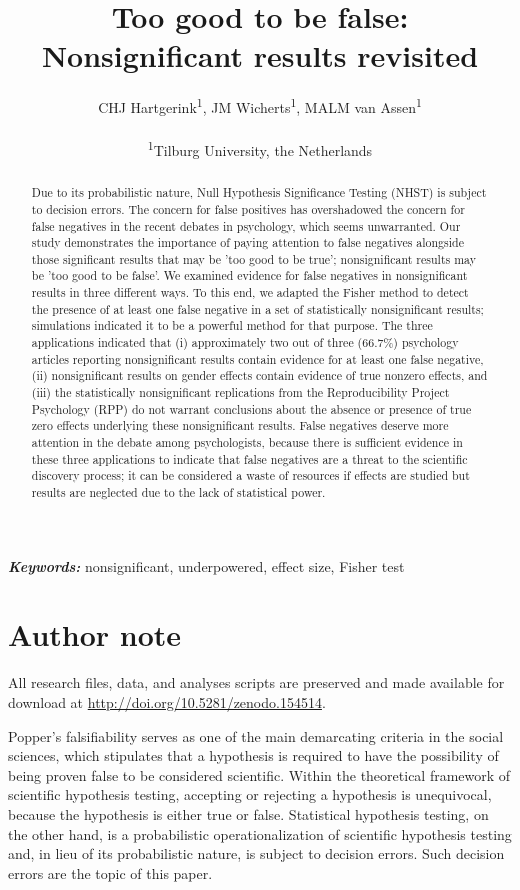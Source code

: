 \documentclass{article}
\title{Too good to be false: Nonsignificant results revisited}
\author{CHJ Hartgerink\textsuperscript{1}, JM Wicherts\textsuperscript{1}, MALM van Assen\textsuperscript{1}\\ \\
\textsuperscript{1}Tilburg University, the Netherlands}
\providecommand{\keywords}[1]{\textbf{\textit{Keywords:}} #1}
\begin{document}

\maketitle

\begin{abstract}
Due to its probabilistic nature, Null Hypothesis Significance Testing (NHST) is subject to decision errors. The concern for false positives has overshadowed the concern for false negatives in the recent debates in psychology, which seems unwarranted. Our study demonstrates the importance of paying attention to false negatives alongside those significant results that may be 'too good to be true'; nonsignificant results may be 'too good to be false'. We examined evidence for false negatives in nonsignificant results in three different ways. To this end, we adapted the Fisher method to detect the presence of at least one false negative in a set of statistically nonsignificant results; simulations indicated it to be a powerful method for that purpose. The three applications indicated that (i) approximately two out of three (66.7\%) psychology articles reporting nonsignificant results contain evidence for at least one false negative, (ii) nonsignificant results on gender effects contain evidence of true nonzero effects, and (iii) the statistically nonsignificant replications from the Reproducibility Project Psychology (RPP) do not warrant conclusions about the absence or presence of true zero effects underlying these nonsignificant results. False negatives deserve more attention in the debate among psychologists, because there is sufficient evidence in these three applications to indicate that false negatives are a threat to the scientific discovery process; it can be considered a waste of resources if effects are studied but results are neglected due to the lack of statistical power.
\end{abstract}

\keywords{nonsignificant, underpowered, effect size, Fisher test}

\section*{Author note}
All research files, data, and analyses scripts are preserved and made available for download at \url{http://doi.org/10.5281/zenodo.154514}.
\newpage


Popper's \cite{Popper2005-xu} falsifiability serves as one of the main demarcating criteria in the social sciences, which stipulates that a hypothesis is required to have the possibility of being proven false to be considered scientific. Within the theoretical framework of scientific hypothesis testing, accepting or rejecting a hypothesis is unequivocal, because the hypothesis is either true or false. Statistical hypothesis testing, on the other hand, is a probabilistic operationalization of scientific hypothesis testing \cite{meehl1978theoretical} and, in lieu of its probabilistic nature, is subject to decision errors. Such decision errors are the topic of this paper.
\end{document}
